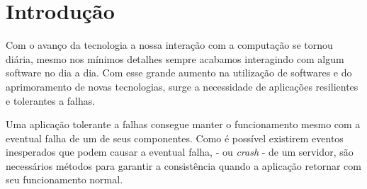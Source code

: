 \documentclass[12pt,
openright, 
oneside,
a4paper,
brazil]{facom-ufu-abntex2}
\begin{document}
\imprimircapa
\imprimirfolhaderosto








\tableofcontents*
\cleardoublepage


\textual

\chapter{Introdução}

Com o avanço da tecnologia a nossa interação com a computação se tornou diária, mesmo
nos mínimos detalhes sempre acabamos interagindo com algum software no dia a dia. Com
esse grande aumento na utilização de softwares e do aprimoramento de novas tecnologias, 
surge a necessidade de aplicações resilientes e tolerantes a falhas. 

Uma aplicação tolerante a falhas consegue manter o funcionamento mesmo com a eventual 
falha de um de seus componentes. Como é possível existirem eventos inesperados que podem
causar a eventual falha, - ou \textit{crash} - de um servidor, são necessários métodos
para garantir a consistência quando a aplicação retornar com seu funcionamento
normal. 
\end{document}
